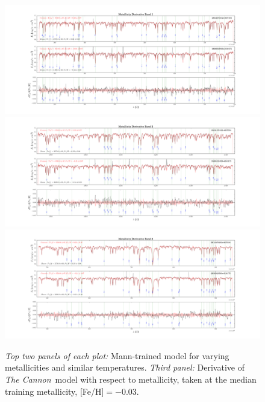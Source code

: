 \documentclass[modern]{aastex62}
\newcommand{\thecannon}{\textsl{The Cannon}}
\begin{document}
\begin{figure}[ht]
\begin{center}
\includegraphics[width=16cm]{figures/demo_derivatives_feh1.png}
\includegraphics[width=16cm]{figures/demo_derivatives_feh2.png}
\includegraphics[width=16cm]{figures/demo_derivatives_feh3.png}
\end{center}
\caption{\textit{Top two panels of each plot:} Mann-trained model for varying metallicities and similar temperatures. \textit{Third panel:} Derivative of \thecannon\ model with respect to metallicity, taken at the median training metallicity, [Fe/H]$=-0.03$.} \label{fig:demo_feh}
\end{figure}
\end{document}
